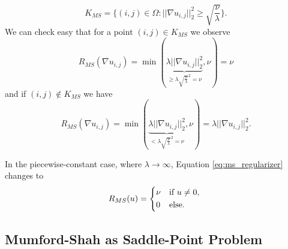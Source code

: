         \begin{equation}
            K_{MS} = \bigg\{ (i, j) \in \Omega : ||\nabla u_{i, j}||_{2}^{2} \ge \sqrt{\frac{\nu}{\lambda}} \bigg\}.
        \label{eq:set_k_ms}
        \end{equation}
    We can check easy that for a point $(i, j) \in K_{MS}$ we observe
        $$
            R_{MS}(\nabla u_{i, j}) = \min(\underbrace{\lambda||\nabla u_{i, j}||_{2}^{2}}_{\ge \lambda \sqrt{\frac{\nu}{\lambda}}^{2} = \nu}, \nu) = \nu
        $$
    and if $(i, j) \notin K_{MS}$ we have
        $$
            R_{MS}(\nabla u_{i, j}) = \min(\underbrace{\lambda||\nabla u_{i, j}||_{2}^{2}}_{< \lambda \sqrt{\frac{\nu}{\lambda}}^{2} = \nu}, \nu) = \lambda||\nabla u_{i, j}||_{2}^{2}.
        $$

    \begin{remark}
        In the piecewise-constant case, where $\lambda \longrightarrow \infty$, Equation \ref{eq:ms_regularizer} changes to
            \begin{equation}
                R_{MS}(u) = 
                    \begin{dcases*}
                        \nu & \textnormal{if $u \ne 0$,} \\
                        0 & \textnormal{else}.
                    \end{dcases*}
            \label{eq:ms_regularizer_piecewise_constant}
            \end{equation}
    \end{remark}

    \subsection{Mumford-Shah as Saddle-Point Problem} %
    \label{sub:mumford_shah_as_saddle_point_problem}

